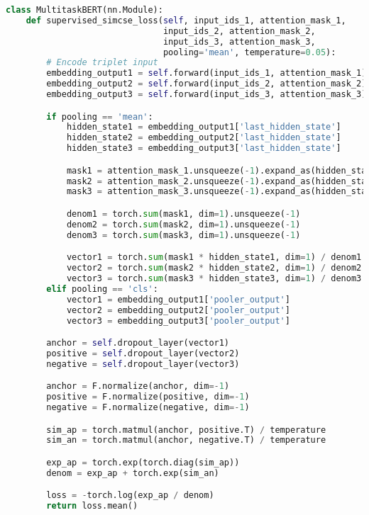 \begin{lstlisting}[language=Python, caption={Supervised SimCSE Loss}, label={lst:simcse_loss}, basicstyle=\ttfamily\small, keywordstyle=\color{blue}, commentstyle=\color{green}, stringstyle=\color{red},linewidth=\textwidth]
class MultitaskBERT(nn.Module):
    def supervised_simcse_loss(self, input_ids_1, attention_mask_1,
                               input_ids_2, attention_mask_2,
                               input_ids_3, attention_mask_3,
                               pooling='mean', temperature=0.05):
        # Encode triplet input
        embedding_output1 = self.forward(input_ids_1, attention_mask_1)
        embedding_output2 = self.forward(input_ids_2, attention_mask_2)
        embedding_output3 = self.forward(input_ids_3, attention_mask_3)

        if pooling == 'mean':
            hidden_state1 = embedding_output1['last_hidden_state']
            hidden_state2 = embedding_output2['last_hidden_state']
            hidden_state3 = embedding_output3['last_hidden_state']

            mask1 = attention_mask_1.unsqueeze(-1).expand_as(hidden_state1).float()
            mask2 = attention_mask_2.unsqueeze(-1).expand_as(hidden_state2).float()
            mask3 = attention_mask_3.unsqueeze(-1).expand_as(hidden_state3).float()

            denom1 = torch.sum(mask1, dim=1).unsqueeze(-1)
            denom2 = torch.sum(mask2, dim=1).unsqueeze(-1)
            denom3 = torch.sum(mask3, dim=1).unsqueeze(-1)

            vector1 = torch.sum(mask1 * hidden_state1, dim=1) / denom1
            vector2 = torch.sum(mask2 * hidden_state2, dim=1) / denom2
            vector3 = torch.sum(mask3 * hidden_state3, dim=1) / denom3
        elif pooling == 'cls':
            vector1 = embedding_output1['pooler_output']
            vector2 = embedding_output2['pooler_output']
            vector3 = embedding_output3['pooler_output']

        anchor = self.dropout_layer(vector1)
        positive = self.dropout_layer(vector2)
        negative = self.dropout_layer(vector3)

        anchor = F.normalize(anchor, dim=-1)
        positive = F.normalize(positive, dim=-1)
        negative = F.normalize(negative, dim=-1)

        sim_ap = torch.matmul(anchor, positive.T) / temperature
        sim_an = torch.matmul(anchor, negative.T) / temperature

        exp_ap = torch.exp(torch.diag(sim_ap))
        denom = exp_ap + torch.exp(sim_an)

        loss = -torch.log(exp_ap / denom)
        return loss.mean()
\end{lstlisting}

